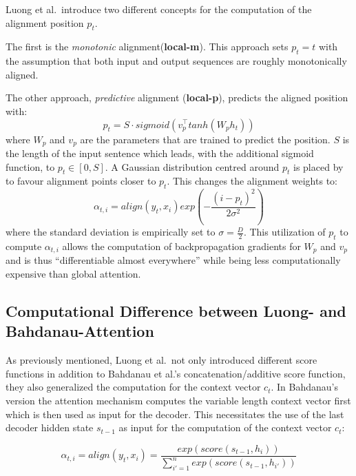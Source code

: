 \documentclass[]{krantz}
\begin{document}
Luong et al.~introduce two different concepts for the computation of the alignment position \(p_t\).

The first is the \emph{monotonic} alignment(\textbf{local-m}).
This approach sets \(p_t= t\) with the assumption that both input and output sequences
are roughly monotonically aligned.

The other approach, \emph{predictive} alignment (\textbf{local-p}), predicts the aligned position with:
\[
p_t = S \cdot sigmoid(v_p^\top tanh(W_ph_t))
\]
where \(W_p\) and \(v_p\) are the parameters that are trained to predict the position.
\(S\) is the length of the input sentence which leads, with the additional sigmoid function, to \(p_t \in [0,S]\).
A Gaussian distribution centred around \(p_t\) is placed by \citet{luong2015effective} to favour alignment points closer to \(p_t\).
This changes the alignment weights to:
\[
\alpha_{t,i} = align(y_t, x_i)exp(-\frac{(i-p_t)^2}{2\sigma^2})
\]
where the standard deviation is empirically set to \(\sigma = \frac{D}{2}\). This
utilization of \(p_t\) to compute \(\alpha_{t,i}\) allows the computation of backpropagation
gradients for \(W_p\) and \(v_p\) and is thus ``differentiable almost everywhere'' \citet{luong2015effective} while being less computationally expensive than global attention.

\hypertarget{computational-difference-between-luong--and-bahdanau-attention}{%
\subsection{Computational Difference between Luong- and Bahdanau-Attention}\label{computational-difference-between-luong--and-bahdanau-attention}}

As previously mentioned, Luong et al.~not only introduced different score functions in addition to Bahdanau et al.'s
concatenation/additive score function, they also generalized the computation for the context vector \(c_t\).
In Bahdanau's version the attention mechanism computes the variable length context vector first which is then used as input for the decoder.
This necessitates the use of the last decoder hidden state \(s_{t-1}\) as input for the computation of the context vector \(c_t\):

\[
\alpha_{t,i} = align(y_t, x_i) =\frac{exp(score(s_{t-1},h_i))}{\sum^{n}_{i'=1}exp(score(s_{t-1},h_{i'}))}
\]
\end{document}
